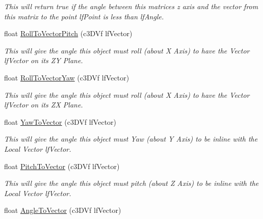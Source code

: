 \begin{DoxyCompactItemize}
\begin{DoxyCompactList}\small\item\em This will return true if the angle between this matrices z axis and the vector from this matrix to the point lfPoint is less than lfAngle. \end{DoxyCompactList}\item 
\hypertarget{classc_matrix4_aeabdf01d5d98c2a3c9f4b811242656c1}{
float \hyperlink{classc_matrix4_aeabdf01d5d98c2a3c9f4b811242656c1}{RollToVectorPitch} (c3DVf lfVector)}
\label{classc_matrix4_aeabdf01d5d98c2a3c9f4b811242656c1}

\begin{DoxyCompactList}\small\item\em This will give the angle this object must roll (about X Axis) to have the Vector lfVector on its ZY Plane. \end{DoxyCompactList}\item 
\hypertarget{classc_matrix4_ad5f6e431adcf465f7ce01544b251b55c}{
float \hyperlink{classc_matrix4_ad5f6e431adcf465f7ce01544b251b55c}{RollToVectorYaw} (c3DVf lfVector)}
\label{classc_matrix4_ad5f6e431adcf465f7ce01544b251b55c}

\begin{DoxyCompactList}\small\item\em This will give the angle this object must roll (about X Axis) to have the Vector lfVector on its ZX Plane. \end{DoxyCompactList}\item 
\hypertarget{classc_matrix4_a8a902847d50d7e5009f71dc294edf8f0}{
float \hyperlink{classc_matrix4_a8a902847d50d7e5009f71dc294edf8f0}{YawToVector} (c3DVf lfVector)}
\label{classc_matrix4_a8a902847d50d7e5009f71dc294edf8f0}

\begin{DoxyCompactList}\small\item\em This will give the angle this object must Yaw (about Y Axis) to be inline with the Local Vector lfVector. \end{DoxyCompactList}\item 
\hypertarget{classc_matrix4_a3c35e449673c3b186c8a4a03e4584a1d}{
float \hyperlink{classc_matrix4_a3c35e449673c3b186c8a4a03e4584a1d}{PitchToVector} (c3DVf lfVector)}
\label{classc_matrix4_a3c35e449673c3b186c8a4a03e4584a1d}

\begin{DoxyCompactList}\small\item\em This will give the angle this object must pitch (about Z Axis) to be inline with the Local Vector lfVector. \end{DoxyCompactList}\item 
\hypertarget{classc_matrix4_a125f58fe6df0728bf235aed83374214e}{
float \hyperlink{classc_matrix4_a125f58fe6df0728bf235aed83374214e}{AngleToVector} (c3DVf lfVector)}
\label{classc_matrix4_a125f58fe6df0728bf235aed83374214e}


\end{DoxyCompactItemize}
